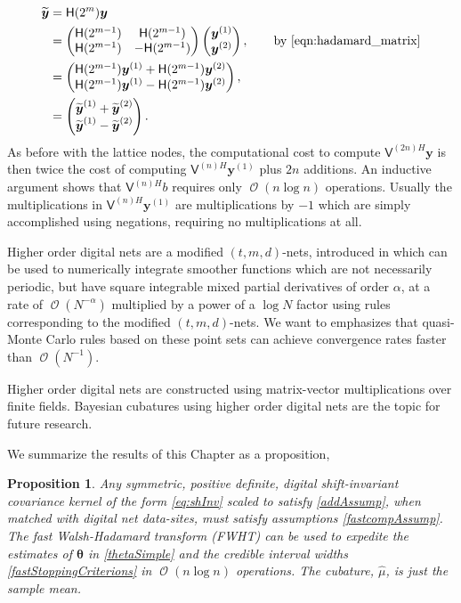 \documentclass{iitthesis}          %
\DeclareMathOperator{\Order}{{\mathcal O}}
\newtheorem{prop}{Proposition}
\newcommand{\bm}[1]{\boldsymbol{#1}}
\newcommand{\vtheta}{{\bm{\theta}}}
\newcommand{\vy}{\bm{y}}
\newcommand{\mH}{\mathsf{H}}
\newcommand{\mV}{\mathsf{V}}
\newcommand{\hmu}{\widehat{\mu}}
\begin{document}
\begin{align*}
\widetilde{\vy} &= \mH({2^m}) {\vy} \\
& = \begin{pmatrix}
\mH({2^{m-1}}) & \mH({2^{m-1}}) \\ \mH({2^{m-1}}) & - \mH({2^{m-1}})
\end{pmatrix} 
\begin{pmatrix}
\vy^{(1)} \\ \vy^{(2)}
\end{pmatrix}, \qquad \text{by \eqref{eqn:hadamard_matrix}} \\
&= 
\begin{pmatrix}
\mH({2^{m-1}} )\vy^{(1)} + \mH({2^{m-1}}) \vy^{(2)} \\ 
\mH({2^{m-1}}) \vy^{(1)} - \mH({2^{m-1}}) \vy^{(2)}
\end{pmatrix},\\
&= 
\begin{pmatrix}
\widetilde{\vy}^{(1)} + \widetilde {\vy}^{(2)} \\ 
\widetilde {\vy}^{(1)} - \widetilde {\vy}^{(2)}
\end{pmatrix}.
\end{align*}
As before with the lattice nodes, the computational cost to compute $\mV^{(2n)H} \vy$ is then
twice the cost of computing $\mV^{(n)H} \vy^{(1)}$ plus $2n$ additions. An inductive argument shows that $\mV^{(n)H}b$ requires only $\Order(n \log n)$ operations. Usually the multiplications in $\mV^{(n)H} \vy^{(1)}$ are multiplications by $-1$ which are simply accomplished using negations, requiring no multiplications at all.


Higher order digital nets are a modified $(t,m,d)$-nets, introduced in \cite{Dic08a} which can be used to numerically integrate smoother functions which are not necessarily periodic, but have square integrable mixed partial derivatives of order $\alpha$, at a rate of $\Order(N^{-\alpha})$ multiplied by a power of a $\log N$ factor using rules corresponding to the modified $(t,m, d)$-nets.
We want to emphasizes that quasi-Monte Carlo rules based on these point sets can achieve convergence rates faster than $\Order(N^{-1})$.

Higher order digital nets are constructed using matrix-vector multiplications over finite
fields. Bayesian cubatures using higher order digital nets are the topic for future research.



We summarize the results of this Chapter as a proposition,
\begin{prop}
	Any symmetric, positive definite, digital shift-invariant covariance kernel of the form \eqref{eq:shInv} scaled to satisfy \eqref{addAssump}, when matched with digital net data-sites, must satisfy assumptions \eqref{fastcompAssump}.  The \emph{fast Walsh-Hadamard transform} (FWHT) can be used to expedite the estimates of $\vtheta$ in \eqref{thetaSimple} and the credible interval widths \eqref{fastStoppingCriterions} in $\Order(n \log n)$ operations. The cubature, $\hmu$, is just the sample mean.
\end{prop}
\end{document}
